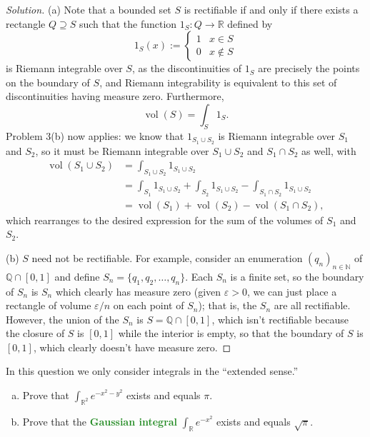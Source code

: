 \documentclass[10pt]{scrartcl}
\providecommand{\eps}{\varepsilon}
\providecommand{\NN}{\mathbb N}
\providecommand{\QQ}{\mathbb Q}
\providecommand{\RR}{\mathbb R}
\providecommand{\ii}{\item}
\newenvironment{soln}{\begin{proof}[Solution]}{\end{proof}}
\providecommand{\vocab}[1]{{\textbf{\textcolor{ForestGreen}{#1}}}}
\begin{document}
\begin{soln}
	(a) Note that a bounded set $S$ is rectifiable
	if and only if there exists a rectangle $Q\supseteq S$
	such that the function $1_S\colon Q\to\RR$ defined by
	\[1_S(x) := \begin{cases}
		1&x\in S\\
		0&x\notin S
	\end{cases}\]
	is Riemann integrable over $S$, as the discontinuities of $1_S$
	are precisely the points on the boundary of $S$, and Riemann integrability
	is equivalent to this set of discontinuities having measure zero.
	Furthermore,
	\[\operatorname{vol}(S) = \int_S 1_S.\]
	Problem 3(b) now applies: we know that $1_{S_1\cup S_2}$
	is Riemann integrable over $S_1$ and $S_2$, so it must be
	Riemann integrable over $S_1\cup S_2$ and $S_1\cap S_2$ as well, with
	\begin{align*}
		\operatorname{vol}(S_1\cup S_2)
		&= \int_{S_1\cup S_2} 1_{S_1\cup S_2}\\
		&= \int_{S_1} 1_{S_1\cup S_2} + \int_{S_2} 1_{S_1\cup S_2}
		- \int_{S_1\cap S_2}1_{S_1\cup S_2}\\
		&= \operatorname{vol}(S_1) + \operatorname{vol}(S_2)
		- \operatorname{vol}(S_1\cap S_2),
	\end{align*}
	which rearranges to the desired expression for
	the sum of the volumes of $S_1$ and $S_2$.
	
	(b) $S$ need not be rectifiable. For example, consider an enumeration
	$(q_n)_{n\in\NN}$ of $\QQ\cap[0,1]$ and define
	$S_n = \{q_1,q_2,\dots,q_n\}$.
	Each $S_n$ is a finite set, so the boundary of $S_n$ is $S_n$
	which clearly has measure zero (given $\eps>0$,
	we can just place a rectangle of volume $\eps/n$ on each point of $S_n$);
	that is, the $S_n$ are all rectifiable.
	However, the union of the $S_n$ is $S = \QQ\cap[0,1]$,
	which isn't rectifiable because the closure of $S$ is $[0,1]$
	while the interior is empty, so that the boundary of $S$ is $[0,1]$,
	which clearly doesn't have measure zero.
\end{soln}

\begin{problem}
	In this question we only consider integrals in the ``extended sense.''
	\begin{enumerate}[(a)]
		\ii Prove that $\int_{\RR^2}e^{-x^2-y^2}$ exists and equals $\pi$.
		\ii Prove that the \vocab{Gaussian integral} $\int_\RR e^{-x^2}$
		exists and equals $\sqrt\pi$.
	\end{enumerate}
\end{problem}
\end{document}
